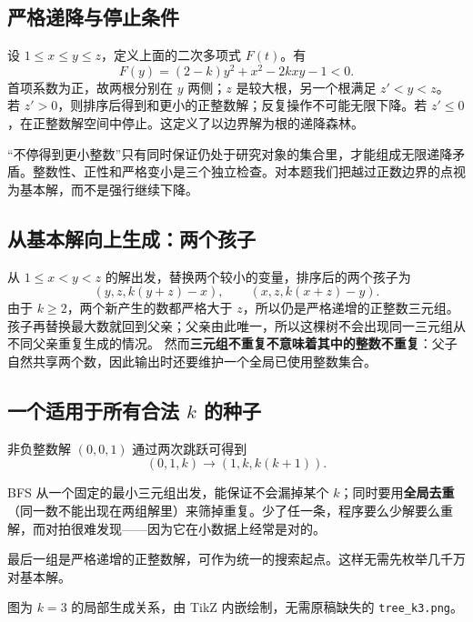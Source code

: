 \subsection{严格递降与停止条件}
设 $1\le x\le y\le z$，定义上面的二次多项式 $F(t)$。有
\[
 F(y)=(2-k)y^2+x^2-2kxy-1<0.
\]
首项系数为正，故两根分别在 $y$ 两侧；$z$ 是较大根，另一个根满足 $z'<y<z$。
若 $z'>0$，则排序后得到和更小的正整数解；反复操作不可能无限下降。若 $z'\le0$，在正整数解空间中停止。这定义了以边界解为根的递降森林。

\begin{pitfall}
“不停得到更小整数”只有同时保证仍处于研究对象的集合里，才能组成无限递降矛盾。整数性、正性和严格变小是三个独立检查。对本题我们把越过正数边界的点视为基本解，而不是强行继续下降。
\end{pitfall}

\subsection{从基本解向上生成：两个孩子}
从 $1\le x<y<z$ 的解出发，替换两个较小的变量，排序后的两个孩子为
\[
 (y,z,k(y+z)-x),\qquad (x,z,k(x+z)-y).
\]
由于 $k\ge2$，两个新产生的数都严格大于 $z$，所以仍是严格递增的正整数三元组。孩子再替换最大数就回到父亲；父亲由此唯一，所以这棵树不会出现同一三元组从不同父亲重复生成的情况。
然而\textbf{三元组不重复不意味着其中的整数不重复}：父子自然共享两个数，因此输出时还要维护一个全局已使用整数集合。

\subsection{一个适用于所有合法 \texorpdfstring{$k$}{k} 的种子}
非负整数解 $(0,0,1)$ 通过两次跳跃可得到
\[
 (0,1,k)\longrightarrow(1,k,k(k+1)).
\]

\begin{tip}
BFS 从一个固定的最小三元组出发，能保证不会漏掉某个 $k$；同时要用\textbf{全局去重}（同一数不能出现在两组解里）来筛掉重复。少了任一条，程序要么少解要么重解，而对拍很难发现——因为它在小数据上经常是对的。
\end{tip}

最后一组是严格递增的正整数解，可作为统一的搜索起点。这样无需先枚举几千万对基本解。

\begin{center}
\end{center}
图为 $k=3$ 的局部生成关系，由 TikZ 内嵌绘制，无需原稿缺失的 \texttt{tree\_k3.png}。

